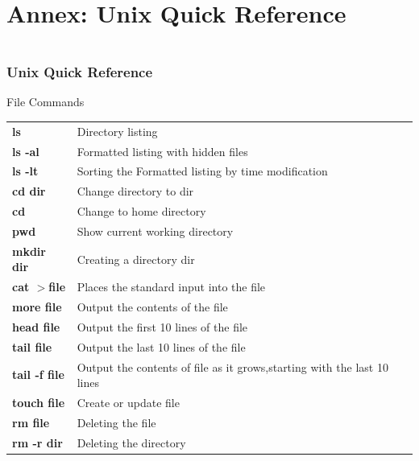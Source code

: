 \documentclass[10pt, hyperref={unicode=true,pdfusetitle, bookmarks=true,bookmarksnumbered=false,bookmarksopen=false, breaklinks=false,pdfborder={0 0 1},backref=true,colorlinks=true,linkcolor=darkblue,pageanchor}]{beamer}
\begin{document}
\section{{\bf{Annex: Unix Quick Reference}}}
\begin{frame}
\begin{columns}[c] 
\tableofcontents[sections={1-9},currentsection, currentsubsection]
\tableofcontents[sections={10-16},currentsection, currentsubsection]
\end{columns}
\end{frame}
\begin{frame}
\frametitle{Unix Quick Reference}
\begin{block}{File Commands}

\begin{tabular}{ll}
\textbf{ls}              & Directory listing                                                     \tabularnewline
\textbf{ls -al}          & Formatted listing with hidden files                                   \tabularnewline
\textbf{ls -lt}          & Sorting the Formatted listing by time modification                    \tabularnewline
\textbf{cd dir}          & Change directory to dir                                               \tabularnewline
\textbf{cd}              & Change to home directory                                              \tabularnewline
\textbf{pwd}             & Show current working directory                                        \tabularnewline
\textbf{mkdir dir}       & Creating a directory dir                                              \tabularnewline
\textbf{cat $>$file}     & Places the standard input into the file                               \tabularnewline
\textbf{more file}       & Output the contents of the file                                       \tabularnewline
\textbf{head file}       & Output the first 10 lines of the file                                 \tabularnewline
\textbf{tail file}       & Output the last 10 lines of the file                                  \tabularnewline
\textbf{tail -f file}    & Output the contents of file as it grows,starting with the last 10 lines \tabularnewline
\textbf{touch file}      & Create or update file                                                 \tabularnewline
\textbf{rm file}         & Deleting the file                                                     \tabularnewline
\textbf{rm -r dir}       & Deleting the directory                                                \tabularnewline
\end{tabular}

\end{block}
\end{frame}
\end{document}
